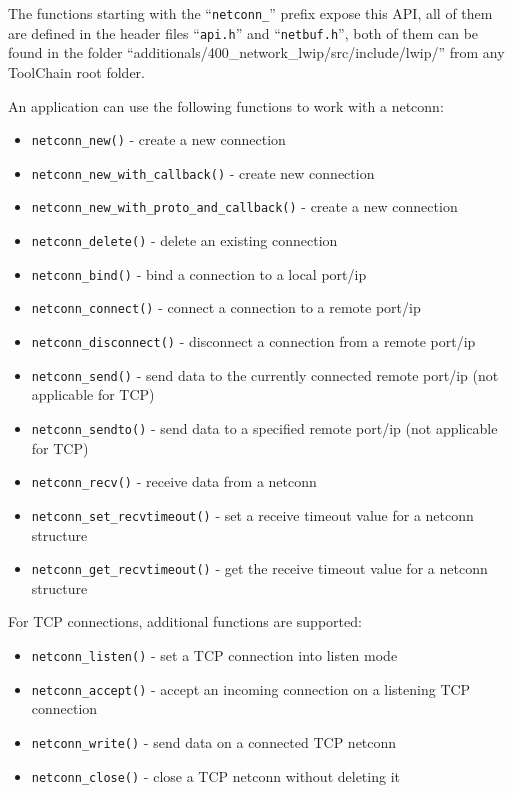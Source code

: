 The functions starting with the ``\verb/netconn_/'' prefix expose this API, all of them are defined in the header files ``\verb/api.h/'' and ``\verb/netbuf.h/'', both of them can be found in the folder ``additionals/400\_network\_lwip/src/include/lwip/'' from any ToolChain root folder.

An application can use the following functions to work with a netconn:

\begin{itemize}
  \item \verb/netconn_new()/ - create a new connection
  \item \verb/netconn_new_with_callback()/ - create new connection
  \item \verb/netconn_new_with_proto_and_callback()/ - create a new connection
  \item \verb/netconn_delete()/ - delete an existing connection
  \item \verb/netconn_bind()/ - bind a connection to a local port/ip
  \item \verb/netconn_connect()/ - connect a connection to a remote port/ip
  \item \verb/netconn_disconnect()/ - disconnect a connection from a remote port/ip
  \item \verb/netconn_send()/ - send data to the currently connected remote port/ip (not applicable for TCP)
  \item \verb/netconn_sendto()/ - send data to a specified remote port/ip (not applicable for TCP)
  \item \verb/netconn_recv()/ - receive data from a netconn
  \item \verb/netconn_set_recvtimeout()/ - set a receive timeout value for a netconn structure
  \item \verb/netconn_get_recvtimeout()/ - get the receive timeout value for a netconn structure
\end{itemize}

    For TCP connections, additional functions are supported:

\begin{itemize}
  \item \verb/netconn_listen()/ - set a TCP connection into listen mode
  \item \verb/netconn_accept()/ - accept an incoming connection on a listening TCP connection
  \item \verb/netconn_write()/ - send data on a connected TCP netconn
  \item \verb/netconn_close()/ - close a TCP netconn without deleting it
\end{itemize}

